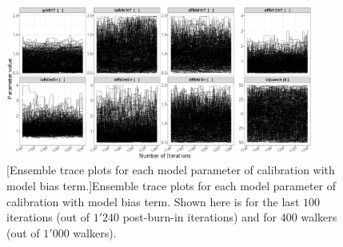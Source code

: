 \clearpage
\begin{figure}
	\centering
	\includegraphics[width=0.90\textwidth]{../figures/chapter5/figures/plotEnsTraceDiscAllCentered}
		[Ensemble trace plots for each model parameter of calibration with model bias term.]{Ensemble trace plots for each model parameter of calibration with model bias term. Shown here is for the last $100$ iterations (out of $1'240$ post-burn-in iterations) and for $400$ walkers (out of $1'000$ walkers).}
	\label{fig:ch5_plot_ens_trace_all_disc_centered}
\end{figure}
\clearpage